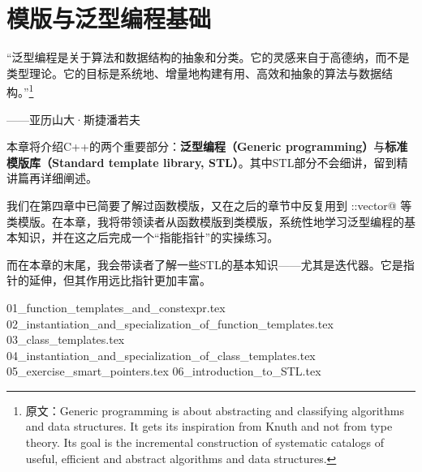 \chapter{模版与泛型编程基础}
{\kaishu \large ``泛型编程是关于算法和数据结构的抽象和分类。它的灵感来自于高德纳，而不是类型理论。它的目标是系统地、增量地构建有用、高效和抽象的算法与数据结构。''\footnote{原文：Generic programming is about abstracting and classifying algorithms and data structures. It gets its inspiration from Knuth and not from type theory. Its goal is the incremental construction of systematic catalogs of useful, efficient and abstract algorithms and data structures.}}
\begin{flushright}——亚历山大·斯捷潘若夫\end{flushright}\par
本章将介绍C++的两个重要部分：\textbf{泛型编程（Generic programming）}与\textbf{标准模版库（Standard template library, STL）}。其中STL部分不会细讲，留到精讲篇再详细阐述。\par
我们在第四章中已简要了解过函数模版，又在之后的章节中反复用到 \lstinline@std::vector@ 等类模版。在本章，我将带领读者从函数模版到类模版，系统性地学习泛型编程的基本知识，并在这之后完成一个``指能指针''的实操练习。\par
而在本章的末尾，我会带读者了解一些STL的基本知识——尤其是迭代器。它是指针的延伸，但其作用远比指针更加丰富。\par
{01_function_templates_and_constexpr.tex}
{02_instantiation_and_specialization_of_function_templates.tex}
{03_class_templates.tex}
{04_instantiation_and_specialization_of_class_templates.tex}
{05_exercise_smart_pointers.tex}
{06_introduction_to_STL.tex}